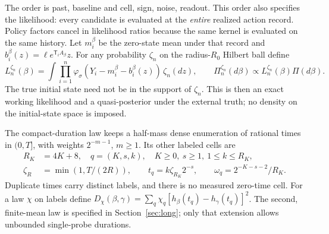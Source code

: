 The order is past, baseline and cell, sign, noise, readout. This order also
specifies the likelihood: every candidate is evaluated at the \emph{entire}
realized action record. Policy factors cancel in likelihood ratios because the
same kernel is evaluated on the same history. Let $m_i^\beta$ be the zero-state
mean under that record and $b_i^\beta(z)=\ell e^{\mathsf T_i A_\beta}z$.
For any probability $\zeta_n$ on the radius-$R_0$ Hilbert ball define
\begin{equation}
 L_n^{\zeta_n}(\beta)=\int\prod_{i=1}^n
 \varphi_\sigma(Y_i-m_i^\beta-b_i^\beta(z))\,\zeta_n(dz),\qquad
 \Pi_n^{\zeta_n}(d\beta)\propto L_n^{\zeta_n}(\beta)\Pi(d\beta).
 \label{eq:posterior}
\end{equation}
The true initial state need not be in the support of $\zeta_n$. This is then
an exact working likelihood and a quasi-posterior under the external truth;
no density on the initial-state space is imposed.

The compact-duration law keeps a half-mass dense enumeration of rational times
in $(0,T]$, with weights $2^{-m-1}$, $m\ge1$. Its other labeled cells are
\begin{equation}
\begin{split}
 R_K&=4K+8,\quad q=(K,s,k),\quad K\ge0,
 \ s\ge1,\ 1\le k\le R_K,\\
 \zeta_R&=\min(1,T/(2R)),\qquad
 t_q=k\zeta_{R_K}2^{-s},\qquad
 \omega_q=2^{-K-s-2}/R_K.
\end{split}\label{eq:compact-law}
\end{equation}
Duplicate times carry distinct labels, and there is no measured zero-time cell.
For a law $\chi$ on labels define
$D_\chi(\beta,\gamma)=\sum_q\chi_q[h_\beta(t_q)-h_\gamma(t_q)]^2$.
The second, finite-mean law is specified in Section~\ref{sec:long}; only that
extension allows unbounded single-probe durations.

